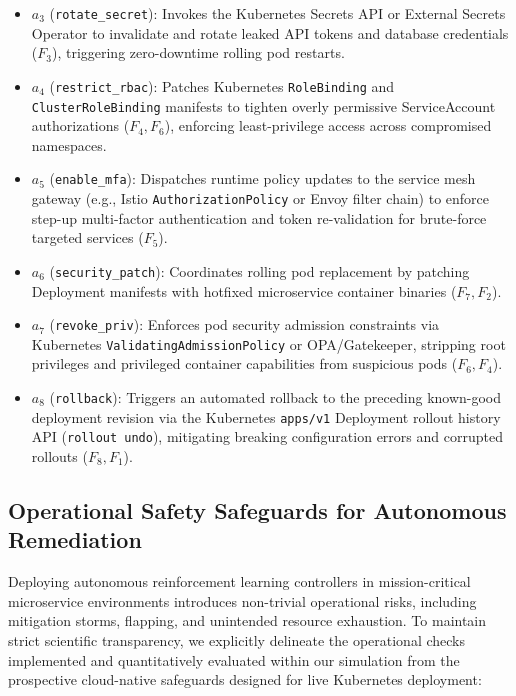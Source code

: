 \documentclass[11pt,a4paper]{article}
\begin{document}
\begin{enumerate}
\begin{itemize}
        \item $a_3$ (\texttt{rotate\_secret}): Invokes the Kubernetes Secrets API or External Secrets Operator to invalidate and rotate leaked API tokens and database credentials ($F_3$), triggering zero-downtime rolling pod restarts.
        \item $a_4$ (\texttt{restrict\_rbac}): Patches Kubernetes \texttt{RoleBinding} and \texttt{ClusterRoleBinding} manifests to tighten overly permissive ServiceAccount authorizations ($F_4, F_6$), enforcing least-privilege access across compromised namespaces.
        \item $a_5$ (\texttt{enable\_mfa}): Dispatches runtime policy updates to the service mesh gateway (e.g., Istio \texttt{AuthorizationPolicy} or Envoy filter chain) to enforce step-up multi-factor authentication and token re-validation for brute-force targeted services ($F_5$).
        \item $a_6$ (\texttt{security\_patch}): Coordinates rolling pod replacement by patching Deployment manifests with hotfixed microservice container binaries ($F_7, F_2$).
        \item $a_7$ (\texttt{revoke\_priv}): Enforces pod security admission constraints via Kubernetes \texttt{ValidatingAdmissionPolicy} or OPA/Gatekeeper, stripping root privileges and privileged container capabilities from suspicious pods ($F_6, F_4$).
        \item $a_8$ (\texttt{rollback}): Triggers an automated rollback to the preceding known-good deployment revision via the Kubernetes \texttt{apps/v1} Deployment rollout history API (\texttt{rollout undo}), mitigating breaking configuration errors and corrupted rollouts ($F_8, F_1$).
    \end{itemize}
\end{enumerate}

\subsection{Operational Safety Safeguards for Autonomous Remediation}
Deploying autonomous reinforcement learning controllers in mission-critical microservice environments introduces non-trivial operational risks, including mitigation storms, flapping, and unintended resource exhaustion. To maintain strict scientific transparency, we explicitly delineate the operational checks implemented and quantitatively evaluated within our simulation from the prospective cloud-native safeguards designed for live Kubernetes deployment:
\end{document}

